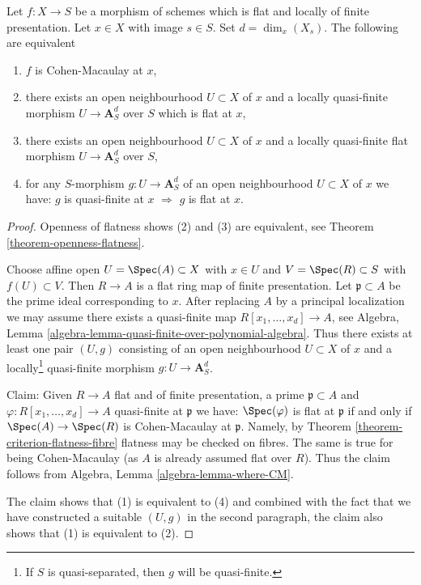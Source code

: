 \begin{lemma}
\label{lemma-flat-finite-presentation-characterize-CM}
Let $f : X \to S$ be a morphism of schemes which is flat and locally
of finite presentation. Let $x \in X$ with image $s \in S$.
Set $d = \dim_x(X_s)$.
The following are equivalent
\begin{enumerate}
\item $f$ is Cohen-Macaulay at $x$,
\item there exists an open neighbourhood $U \subset X$ of $x$
and a locally quasi-finite morphism $U \to \mathbf{A}^d_S$ over $S$
which is flat at $x$,
\item there exists an open neighbourhood $U \subset X$ of $x$
and a locally quasi-finite flat morphism $U \to \mathbf{A}^d_S$ over $S$,
\item for any $S$-morphism $g : U \to \mathbf{A}^d_S$
of an open neighbourhood $U \subset X$ of $x$ we have:
$g$ is quasi-finite at $x$ $\Rightarrow$ $g$ is flat at $x$.
\end{enumerate}
\end{lemma}

\begin{proof}
Openness of flatness shows (2) and (3)
are equivalent, see Theorem \ref{theorem-openness-flatness}.

\medskip\noindent
Choose affine open $U = \Spec(A) \subset X$ with $x \in U$ and
$V = \Spec(R) \subset S$ with $f(U) \subset V$. Then $R \to A$
is a flat ring map of finite presentation. Let $\mathfrak p \subset A$
be the prime ideal corresponding to $x$. After replacing $A$ by a
principal localization we may assume there exists a quasi-finite map
$R[x_1, \ldots, x_d]  \to A$, see
Algebra, Lemma \ref{algebra-lemma-quasi-finite-over-polynomial-algebra}.
Thus there exists at least one pair $(U, g)$ consisting of an
open neighbourhood $U \subset X$ of $x$ and a locally\footnote{If $S$
is quasi-separated, then $g$ will be quasi-finite.} quasi-finite morphism
$g : U \to \mathbf{A}^d_S$.

\medskip\noindent
Claim: Given $R \to A$ flat and of finite presentation, a prime
$\mathfrak p \subset A$ and $\varphi : R[x_1, \ldots, x_d] \to A$
quasi-finite at $\mathfrak p$ we have: $\Spec(\varphi)$
is flat at $\mathfrak p$ if and only if $\Spec(A) \to \Spec(R)$
is Cohen-Macaulay at $\mathfrak p$.  Namely, by
Theorem \ref{theorem-criterion-flatness-fibre}
flatness may be checked on fibres. The same is true
for being Cohen-Macaulay (as $A$ is already assumed flat over $R$).
Thus the claim follows from
Algebra, Lemma \ref{algebra-lemma-where-CM}.

\medskip\noindent
The claim shows that (1) is equivalent to (4) and combined with the
fact that we have constructed a suitable $(U, g)$ in the second
paragraph, the claim also shows that (1) is equivalent to (2).
\end{proof}

